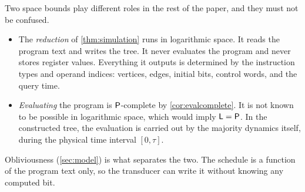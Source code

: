 \begin{remark}\label{rem:twospaces}
Two space bounds play different roles in the rest of the paper, and they must not be confused.
\begin{itemize}
\item The \emph{reduction} of \cref{thm:simulation} runs in logarithmic space. It reads the program
  text and writes the tree. It never evaluates the program and never stores register values.
  Everything it outputs is determined by the instruction types and operand indices: vertices,
  edges, initial bits, control words, and the query time.
\item \emph{Evaluating} the program is $\mathsf{P}$-complete by \cref{cor:evalcomplete}. It is not
  known to be possible in logarithmic space, which would imply $\mathsf{L}=\mathsf{P}$. In the constructed
  tree, the evaluation is carried out by the majority dynamics itself, during the physical time
  interval $[0,\tau]$.
\end{itemize}
Obliviousness (\cref{sec:model}) is what separates the two. The schedule is a function of the
program text only, so the transducer can write it without knowing any computed bit.
\end{remark}
